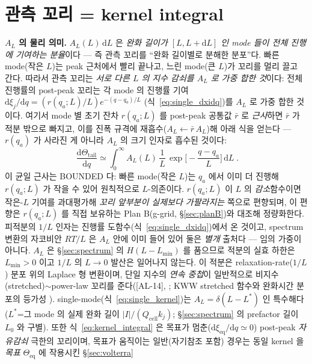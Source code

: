 \documentclass[11pt,a4paper]{article}
\newcommand{\dd}{\mathrm{d}}
\newcommand{\eq}{\mathrm{eq}}
\newcommand{\cell}{\mathrm{cell}}
\newcommand{\AL}[1]{\textsf{[AL-#1]}}
\begin{document}
\section{관측 꼬리 = kernel integral}\label{sec:kernel}
\textbf{$A_L$ 의 물리 의미.} $A_L(L)\,\dd L$ 은 \emph{완화 길이가 $[L,L+\dd L]$ 인 mode 들이 전체 진행에 기여하는
분율}이다 — 즉 관측 꼬리를 ``완화 길이별로 분해한 분포''다. 빠른 mode(작은 $L$)는 peak 근처에서 빨리 끝나고,
느린 mode(큰 $L$)가 꼬리를 멀리 끌고 간다. 따라서 관측 꼬리는 \emph{서로 다른 $L$ 의 지수 감쇠를 $A_L$ 로 가중
합한 것}이다: 전체 진행률의 post-peak 꼬리는 각 mode 의 진행률 기여 $\dd\xi_j/\dd q=(r(q_a;L)/L)e^{-(q-q_a)/L}$
(식~\eqref{eq:single_dxidq})를 $A_L$ 로 가중 합한 것이다. 여기서 mode 별 초기 잔차 $r(q_a;L)$ 를 post-peak
공통값 $\bar r$ 로 \emph{근사}하면 $\bar r$ 가 적분 밖으로 빠지고, 이를 진폭 규격에 재흡수($A_L\!\leftarrow\!\bar r\,A_L$)해
아래 식을 얻는다 — $r(q_a)$ 가 사라진 게 아니라 $A_L$ 의 크기 인자로 흡수된 것이다:
\begin{equation}
\boxed{\;\frac{\dd\Theta_\mathrm{tail}}{\dd q}\simeq\int_0^\infty A_L(L)\,\frac1L\,
\exp\!\Big[-\frac{q-q_a}{L}\Big]\,\dd L\;.}
\label{eq:kernel_integral}
\end{equation}
이 균일 근사는 BOUNDED 다: 빠른 mode(작은 $L$)는 $q_a$ 에서 이미 더 진행해 $r(q_a;L)$ 가 작을 수 있어 원칙적으로
$L$-의존이다. $r(q_a;L)$ 이 $L$ 의 \emph{감소}함수이면 작은-$L$ 기여를 과대평가해 \emph{꼬리 앞부분이 실제보다
가팔라지는} 쪽으로 편향되며, 이 편향은 $r(q_a;L)$ 를 직접 보유하는 Plan B(g-grid, \S\ref{sec:planB})와 대조해
정량화한다. 피적분의 $1/L$ 인자는 진행률 도함수(식~\eqref{eq:single_dxidq})에서 온 것이고, spectrum 변환의
자코비안 $RT/L$ 은 $A_L$ 안에 이미 들어 있어 둘은 \emph{별개} 출처다 — 임의 가중이 아니다. $A_L$ 은 \S\ref{sec:spectrum}
의 $H(L-L_{\min})$ 를 품으므로 적분의 실효 하한은 $L_{\min}>0$ 이고 $1/L$ 의 $L\!\to\!0$ 발산은 일어나지 않는다.
이 적분은 relaxation-rate($1/L$) 분포 위의 Laplace 형 변환이며, 단일 지수의 \emph{연속 중첩}이 일반적으로 비지수
(stretched)$\sim$power-law 꼬리를 준다(\AL{14}, \cite{johnston2006}; KWW stretched 함수와 완화시간 분포의
등가성 \cite{lindsey1980}). single-mode(식~\eqref{eq:single_kernel})는 $A_L=\delta(L-L^\ast)$ 인 특수해다
($L^\ast$=그 mode 의 실제 완화 길이 $|I|/(Q_\cell k_j)$; \S\ref{sec:spectrum} 의 prefactor 길이 $L_0$ 와 구별).
또한 식~\eqref{eq:kernel_integral} 은 목표가 멈춘($\dd\xi_\eq/\dd q\!\simeq\!0$) post-peak \emph{자유감쇠} 극한의 꼬리이며,
목표가 움직이는 일반(자기참조 포함) 경우는 동일 kernel 을 \emph{목표} $\Theta_\eq$ 에 작용시킨 \S\ref{sec:volterra}
\end{document}

